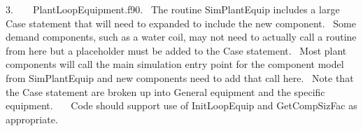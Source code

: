 3.~~~~PlantLoopEquipment.f90.~ The routine SimPlantEquip includes a large Case statement that will need to expanded to include the new component.~ Some demand components, such as a water coil, may not need to actually call a routine from here but a placeholder must be added to the Case statement.~ Most plant components will call the main simulation entry point for the component model from SimPlantEquip and new components need to add that call here.~ Note that the Case statement are broken up into General equipment and the specific equipment.~~~ Code should support use of InitLoopEquip and GetCompSizFac as appropriate.
